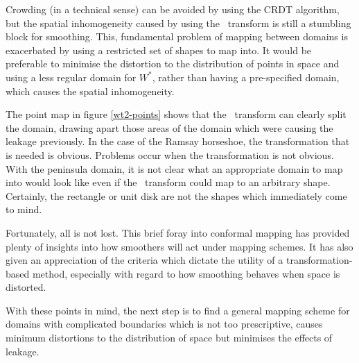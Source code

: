 Crowding (in a technical sense) can be avoided by using the CRDT algorithm, but the spatial inhomogeneity caused by using the \sch\ transform is still a stumbling block for smoothing. This, fundamental problem of mapping between domains is exacerbated by using a restricted set of shapes to map into. It would be preferable to minimise the distortion to the distribution of points in space and using a less regular domain for $W^*$, rather than having a pre-specified domain, which causes the spatial inhomogeneity.

The point map in figure \ref{wt2-points} shows that the \sch\ transform can clearly split the domain, drawing apart those areas of the domain which were causing the leakage previously. In the case of the Ramsay horseshoe, the transformation that is needed is obvious. Problems occur when the transformation is not obvious. With the peninsula domain, it is not clear what an appropriate domain to map into would look like even if the \sch\ transform could map to an arbitrary shape. Certainly, the rectangle or unit disk are not the shapes which immediately come to mind.

Fortunately, all is not lost. This brief foray into conformal mapping has provided plenty of insights into how smoothers will act under mapping schemes. It has also given an appreciation of the criteria which dictate the utility of a transformation-based method, especially with regard to how smoothing behaves when space is distorted.

With these points in mind, the next step is to find a general mapping scheme for domains with complicated boundaries which is not too prescriptive, causes minimum distortions to the distribution of space but minimises the effects of leakage.



